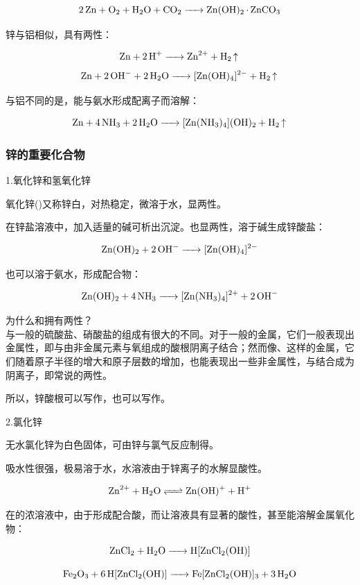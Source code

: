 \documentclass[a4paper,UTF8]{article}
\begin{document}
$$ \ce{2Zn + O2 + H2O + CO2 -> Zn(OH)2 * ZnCO3} $$

锌与铝相似，具有两性：

$$ \ce{Zn + 2H+ -> Zn^{2+} + H2 ^} $$
$$ \ce{Zn + 2OH- + 2H2O -> [Zn(OH)4]^{2-} + H2 ^} $$

与铝不同的是，能与氨水形成配离子而溶解：

$$ \ce{Zn + 4NH3 + 2H2O -> [Zn(NH3)4](OH)2 + H2 ^} $$

\subsubsection{锌的重要化合物}

1.氧化锌和氢氧化锌

氧化锌()又称锌白，对热稳定，微溶于水，显两性。

在锌盐溶液中，加入适量的碱可析出沉淀。也显两性，溶于碱生成锌酸盐：

$$ \ce{Zn(OH)2 + 2OH- -> [Zn(OH)4]^{2-}} $$

也可以溶于氨水，形成配合物：

$$ \ce{Zn(OH)2 + 4NH3 -> [Zn(NH3)4]^{2+} + 2OH-} $$

\begin{tcolorbox}

为什么和拥有两性？\\

与一般的硫酸盐、硝酸盐的组成有很大的不同。对于一般的金属，它们一般表现出金属性，即与由非金属元素与氧组成的酸根阴离子结合；然而像、这样的金属，它们随着原子半径的增大和原子层数的增加，也能表现出一些非金属性，与结合成为阴离子，即常说的两性。

所以，锌酸根可以写作，也可以写作。

\end{tcolorbox}

2.氯化锌

无水氯化锌为白色固体，可由锌与氯气反应制得。

吸水性很强，极易溶于水，水溶液由于锌离子的水解显酸性。

$$ \ce{Zn^{2+} + H2O <=> Zn(OH)+ + H+} $$

在的浓溶液中，由于形成配合酸，而让溶液具有显著的酸性，甚至能溶解金属氧化物：

$$ \ce{ZnCl2 + H2O -> H[ZnCl2(OH)]} $$

$$ \ce{Fe2O3 + 6H[ZnCl2(OH)] -> Fe[ZnCl2(OH)]3 + 3H2O} $$
\end{document}
